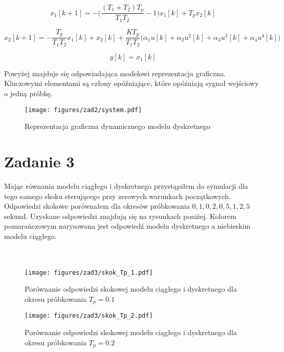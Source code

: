 \documentclass[a4paper,titlepage,11pt,floatssmall]{mwrep}
\begin{document}
\begin{equation*}
x_1[k+1] = -\bigg(\frac{(T_1 + T_2)T_p}{T_1 T_2} - 1\bigg)x_1[k] + T_p x_2[k] 
\end{equation*}

\begin{equation*}
x_2[k+1] = -\frac{T_p}{T_1 T_2}x_1[k] + x_2[k] + \frac{K T_p}{T_1 T_2}\big( \alpha_1 u[k] + \alpha_2 u^2[k] + \alpha_3 u^3[k] + \alpha_4 u^4[k]\big)
\end{equation*}

\begin{equation*}
y[k] = x_1[k]
\end{equation*}

Powyżej znajduje się odpowiadająca modelowi reprezentacja graficzna. Kluczowymi elementami są człony opóźniające, które opóźniają sygnał wejściowy o jedną próbkę.

\begin{figure}[H]
\begin{center}
\texttt{[image: figures/zad2/system.pdf]}
\caption{Reprezentacja graficzna dynamicznego modelu dyskretnego}
\end{center}
\end{figure}
 

\section{Zadanie 3}
\indent{} Mając równania modelu ciągłego i dyskretnego przystąpiłem do symulacji dla tego samego skoku sterującego przy zerowych warunkach początkowych. Odpowiedzi skokowe porównałem dla okresów próbkowania $0,1, 0,2, 0,5, 1, 2, 5$ sekund. Uzyskane odpowiedzi znajdują się na rysunkach poniżej. Kolorem pomarańczowym narysowana jest odpowiedź modelu dyskretnego a niebieskim modelu ciągłego.
\\
\\
\\
\bigskip
\begin{figure}[H]
\centering
\texttt{[image: figures/zad3/skok\_Tp\_1.pdf]}
\caption{Porównanie odpowiedzi skokowej modelu ciągłego i dyskretnego dla okresu próbkowania $T_p = 0.1$}
\end{figure}
\newpage
\begin{figure}[H]
\centering
\texttt{[image: figures/zad3/skok\_Tp\_2.pdf]}
\caption{Porównanie odpowiedzi skokowej modelu ciągłego i dyskretnego dla okresu próbkowania $T_p = 0.2$}
\end{figure}
\end{document}
